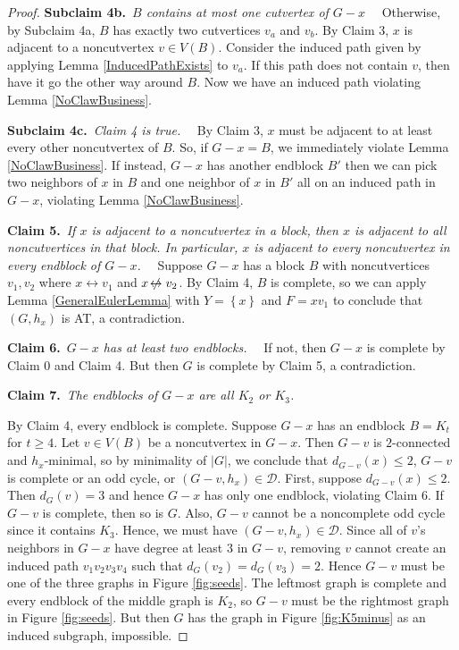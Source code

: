 \documentclass[12pt]{article}
\theoremstyle{plain}
\theoremstyle{definition}
\theoremstyle{remark}
\newcommand{\fancy}[1]{\mathcal{#1}}
\newcommand{\D}{\fancy{D}}
\newcommand{\set}[1]{\left\{ #1 \right\}}
\newcommand{\card}[1]{\left|#1\right|}
\def\adj{\leftrightarrow}
\def\nonadj{\not\!\leftrightarrow}
\def\D{\fancy{D}}
\newcommand{\claim}[2]{{\bf Claim #1.}~{\it #2}~~}
\newcommand{\subclaim}[2]{{\bf Subclaim #1.}~{\it #2}~~}
\def\adj{\leftrightarrow}
\begin{document}
\begin{proof}
	  \subclaim{4b}{$B$ contains at most one cutvertex of $G-x$}
	  Otherwise, by Subclaim 4a, $B$ has exactly two cutvertices $v_a$ and $v_b$.  By Claim 3, $x$ is adjacent to a noncutvertex $v \in V(B)$.  Consider the induced path given by applying Lemma \ref{InducedPathExists} to $v_a$.  If this path does not contain $v$, then have it go the other way around $B$.  Now we have an induced path violating Lemma \ref{NoClawBusiness}. 
	
	  \subclaim{4c}{Claim 4 is true.}
	  By Claim 3, $x$ must be adjacent to at least every other noncutvertex of $B$. So, if $G-x = B$, we immediately violate Lemma \ref{NoClawBusiness}.  If instead, $G-x$ has another endblock $B'$ then we can pick two neighbors of $x$ in $B$ and one neighbor of $x$ in $B'$ all on an induced path in $G-x$, violating Lemma \ref{NoClawBusiness}.
	 
	 \claim{5}{If $x$ is adjacent to a noncutvertex in a block, then $x$ is adjacent to all noncutvertices in that block. In particular, $x$ is adjacent to every noncutvertex in every endblock of $G-x$.}
	  Suppose $G-x$ has a block $B$ with noncutvertices $v_1,v_2$ where $x \adj v_1$ and $x \nonadj v_2$.  By Claim 4, $B$ is complete, so we can apply Lemma \ref{GeneralEulerLemma} with $Y = \set{x}$ and $F = xv_1$ to conclude that $(G,h_x)$ is AT, a contradiction.  
	 	 
	 \claim{6}{$G-x$ has at least two endblocks.}
   	  If not, then $G-x$ is complete by Claim 0 and Claim 4.  But then $G$ is complete by Claim 5, a contradiction.
	 
	 \claim{7}{The endblocks of $G-x$ are all $K_2$ or $K_3$.}

	 By Claim 4, every endblock is complete.  Suppose $G-x$ has an endblock $B = K_t$ for $t \ge 4$.  Let $v \in V(B)$ be a noncutvertex in $G-x$.  Then $G-v$ is $2$-connected and $h_x$-minimal, so by minimality of $\card{G}$, we conclude that $d_{G-v}(x) \le 2$, $G-v$ is complete or an odd cycle, or $(G-v,h_x) \in \D$.  First, suppose $d_{G-v}(x) \le 2$.  Then $d_G(v) = 3$ and hence $G-x$ has only one endblock, violating Claim 6.  If $G-v$ is complete, then so is $G$.  Also, $G-v$ cannot be a noncomplete odd cycle since it contains $K_3$.  Hence, we must have $(G-v,h_x) \in \D$.  Since all of $v$'s neighbors in $G-x$ have degree at least $3$ in $G-v$, removing $v$ cannot create an induced path $v_1v_2v_3v_4$ such that $d_G(v_2) = d_G(v_3) = 2$.  Hence $G-v$ must be one of the three graphs in Figure \ref{fig:seeds}.  The leftmost graph is complete and every endblock of the middle graph is $K_2$, so $G-v$ must be the rightmost graph in Figure \ref{fig:seeds}.  But then $G$ has the graph in Figure \ref{fig:K5minus} as an induced subgraph, impossible.  
	 

\end{proof}
\end{document}
